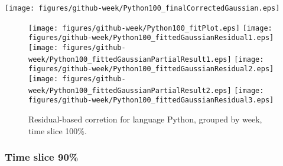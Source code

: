 \begin{center}
{\texttt{[image: figures/github-week/Python100\_finalCorrectedGaussian.eps]}}
\end{center}

\FloatBarrier

\begin{figure}[t]
\centering
{}
{\texttt{[image: figures/github-week/Python100\_fitPlot.eps]}}
{\texttt{[image: figures/github-week/Python100\_fittedGaussianResidual1.eps]}}
{\texttt{[image: figures/github-week/Python100\_fittedGaussianPartialResult1.eps]}}
{\texttt{[image: figures/github-week/Python100\_fittedGaussianResidual2.eps]}}
{\texttt{[image: figures/github-week/Python100\_fittedGaussianPartialResult2.eps]}}
{\texttt{[image: figures/github-week/Python100\_fittedGaussianResidual3.eps]}}
\caption{Residual-based corretion for language Python, grouped by week, time slice 100\%.}
\end{figure}


\FloatBarrier


\subsubsection{Time slice 90\%}

